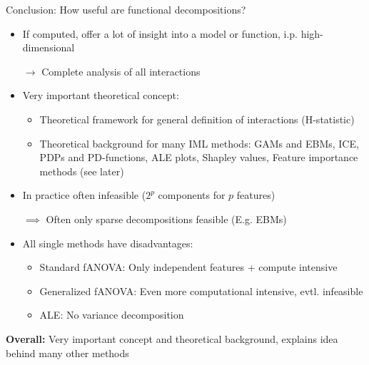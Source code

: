 \documentclass[11pt,compress,t,notes=noshow, aspectratio=169, xcolor=table]{beamer}
\begin{document}
\begin{frame}{Conclusion: How useful are functional decompositions?}
\begin{itemize}
        \item If computed, offer a lot of insight into a model or function, i.p. high-dimensional
        \item[$\rightarrow$] Complete analysis of all interactions
        \pause
        \item Very important theoretical concept:
        \begin{itemize}
            \item Theoretical framework for general definition of interactions (H-statistic)
            \item Theoretical background for many IML methods:
                GAMs and EBMs, 
                ICE, PDPs and PD-functions,
                ALE plots,
                Shapley values,
                Feature importance methods (see later)
        \end{itemize}
        \pause
        \item In practice often infeasible ($2^p$ components for $p$ features)
        \item[$\implies$] Often only sparse decompositions feasible (E.g. EBMs)
        \pause
        \item All single methods have disadvantages:
        \begin{itemize}
            \item Standard fANOVA: Only independent features + compute intensive
            \item Generalized fANOVA: Even more computational intensive, evtl. infeasible
            \item ALE: No variance decomposition
        \end{itemize}
        
    \end{itemize}

    \pause
    \textbf{Overall:} Very important concept and theoretical background, explains idea behind many other methods
    
\end{frame}










\endlecture
\end{document}
